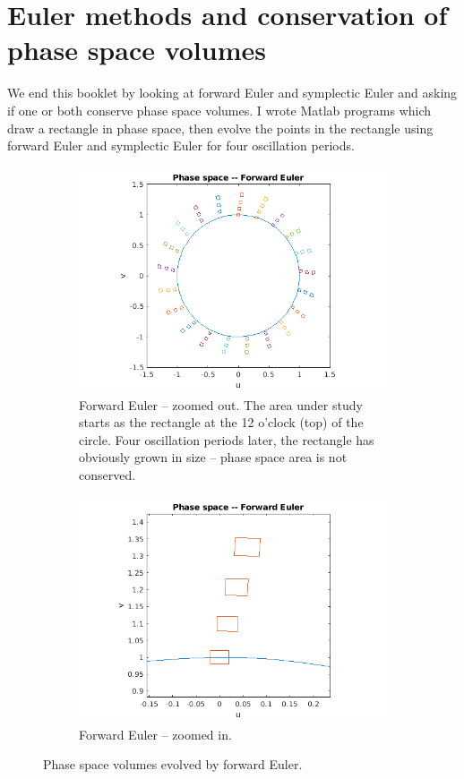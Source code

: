 \documentclass[hidelinks,notitlepage]{book}
\begin{document}
\section{Euler methods and conservation of phase space volumes}
We end this booklet by looking at forward Euler and symplectic Euler and asking if one or both conserve phase space volumes.  I wrote Matlab programs which draw a rectangle in phase space, then evolve the points in the rectangle using forward Euler and symplectic Euler for four oscillation periods.  
\begin{figure}[h!]
\begin{subfigure}[t]{0.5\columnwidth}
	\centering
	\includegraphics[width=1.1\linewidth]{ForwardEulerPhaseSpace_ZoomOut.png}
	\caption{Forward Euler -- zoomed out.  The area under study starts as the rectangle at the 12 o'clock (top) of the circle.  Four oscillation periods later, the rectangle has obviously grown in size -- phase space area is not conserved.}
	\label{fig:ForwardEulerPhaseSpace_ZoomOut}
\end{subfigure}
\begin{subfigure}[t]{0.5\columnwidth}
	\centering
	\includegraphics[width=1.1\linewidth]{ForwardEulerPhaseSpace_ZoomIn.png}
	\caption{Forward Euler -- zoomed in.}
	\label{fig:ForwardEulerPhaseSpace_ZoomIn}
\end{subfigure}
\caption{Phase space volumes evolved by forward Euler.}
\label{fig:ForwardEulerPhaseSpace}
\end{figure}
\end{document}

